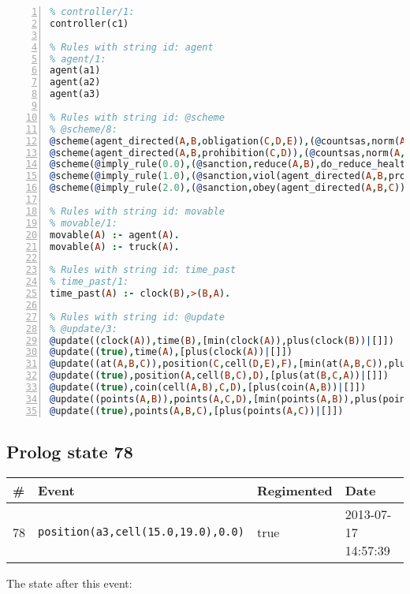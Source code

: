 \documentclass[11pt]{article}\usepackage[utf8]{inputenc}\usepackage{geometry}
\begin{document}
\begin{lstlisting}[language=Prolog, numbers=left]
% Rules with string id: controller
% controller/1:
controller(c1)

% Rules with string id: agent
% agent/1:
agent(a1)
agent(a2)
agent(a3)

% Rules with string id: @scheme
% @scheme/8:
@scheme(agent_directed(A,B,obligation(C,D,E)),(@countsas,norm(A,B,F,obligation(C,D,E)),F),false,(listTrue(C)),(time_past(D)),false,[plus(viol(agent_directed(A,B,obligation(C,D,E))))|[]],[plus(obey(agent_directed(A,B,obligation(C,D,E))))|[]])
@scheme(agent_directed(A,B,prohibition(C,D)),(@countsas,norm(A,B,E,prohibition(C,D)),E),(listTrue(C)),false,(false),false,[plus(viol(agent_directed(A,B,prohibition(C,D))))|[]],[plus(obey(agent_directed(A,B,prohibition(C,D))))|[]])
@scheme(@imply_rule(0.0),(@sanction,reduce(A,B),do_reduce_health(A,B),notifyAgent(A,changed(status))),true,false,false,false,[min(reduce(A,B))|[]],[])
@scheme(@imply_rule(1.0),(@sanction,viol(agent_directed(A,B,prohibition(C,D))),do_sanction(D)),true,false,false,false,[min(viol(agent_directed(A,B,prohibition(C,D))))|[]],[])
@scheme(@imply_rule(2.0),(@sanction,obey(agent_directed(A,B,C))),true,false,false,false,[min(obey(agent_directed(A,B,C)))|[]],[])

% Rules with string id: movable
% movable/1:
movable(A) :- agent(A).
movable(A) :- truck(A).

% Rules with string id: time_past
% time_past/1:
time_past(A) :- clock(B),>(B,A).

% Rules with string id: @update
% @update/3:
@update((clock(A)),time(B),[min(clock(A)),plus(clock(B))|[]])
@update((true),time(A),[plus(clock(A))|[]])
@update((at(A,B,C)),position(C,cell(D,E),F),[min(at(A,B,C)),plus(at(D,E,C))|[]])
@update((true),position(A,cell(B,C),D),[plus(at(B,C,A))|[]])
@update((true),coin(cell(A,B),C,D),[plus(coin(A,B))|[]])
@update((points(A,B)),points(A,C,D),[min(points(A,B)),plus(points(A,D))|[]])
@update((true),points(A,B,C),[plus(points(A,C))|[]])

\end{lstlisting}
\clearpage 
\subsection{Prolog state 78}
\begin{table}[ht]
\centering 
\begin{tabular}{l l l l} 
\textbf{\#} & \textbf{Event} & \textbf{Regimented} & \textbf{Date} \\ [0.5ex] 
\hline
78&\texttt{position(a3,cell(15.0,19.0),0.0)}&true&2013-07-17 14:57:39\\ [1ex] \hline\end{tabular}
\end{table}
The state after this event:
\end{document}
